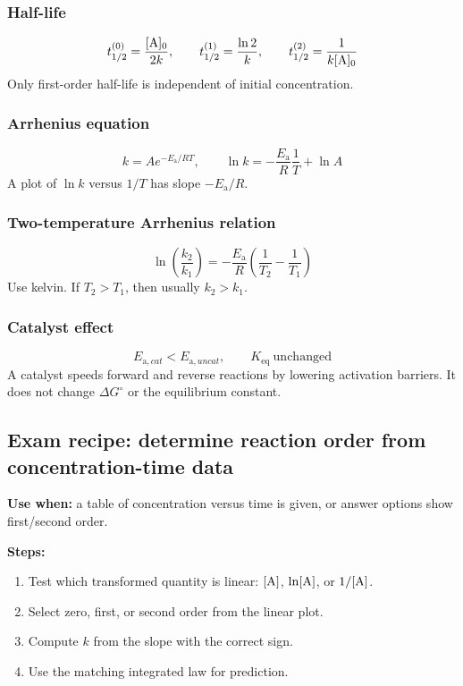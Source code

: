 \subsubsection{Half-life}
\[
t_{1/2}^{(0)}=\frac{[\ce{A}]_0}{2k}, \qquad
t_{1/2}^{(1)}=\frac{\ln2}{k}, \qquad
t_{1/2}^{(2)}=\frac{1}{k[\ce{A}]_0}
\]
Only first-order half-life is independent of initial concentration.

\subsubsection{Arrhenius equation}
\[
k=Ae^{-E_{\mathrm a}/RT}, \qquad
\ln k=-\frac{E_{\mathrm a}}{R}\frac{1}{T}+\ln A
\]
A plot of \(\ln k\) versus \(1/T\) has slope \(-E_{\mathrm a}/R\).

\subsubsection{Two-temperature Arrhenius relation}
\[
\ln\left(\frac{k_2}{k_1}\right)
=-\frac{E_{\mathrm a}}{R}\left(\frac{1}{T_2}-\frac{1}{T_1}\right)
\]
Use kelvin. If \(T_2>T_1\), then usually \(k_2>k_1\).

\subsubsection{Catalyst effect}
\[
E_{\mathrm a,cat}<E_{\mathrm a,uncat}, \qquad K_{\mathrm{eq}}\ \text{unchanged}
\]
A catalyst speeds forward and reverse reactions by lowering activation barriers. It does not change \(\Delta G^\circ\) or the equilibrium constant.

\subsection{Exam recipe: determine reaction order from concentration-time data}
\textbf{Use when:} a table of concentration versus time is given, or answer options show first/second order.

\textbf{Steps:}
\begin{enumerate}
    \item Test which transformed quantity is linear: \([\ce{A}]\), \(\ln[\ce{A}]\), or \(1/[\ce{A}]\).
    \item Select zero, first, or second order from the linear plot.
    \item Compute \(k\) from the slope with the correct sign.
    \item Use the matching integrated law for prediction.
\end{enumerate}


